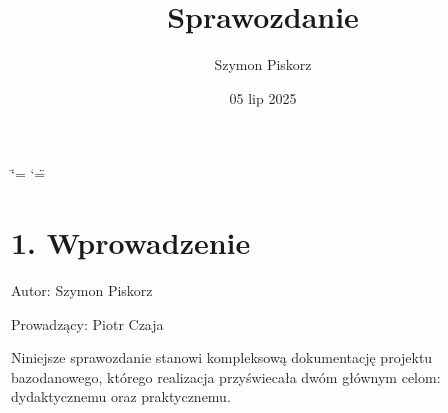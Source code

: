 \documentclass[letterpaper,10pt,polish]{sphinxmanual}
\title{Sprawozdanie}
\date{05 lip 2025}
\author{Szymon Piskorz}
\begin{document}
\ifdefined\shorthandoff
  \ifnum\catcode`\=\string=\active\shorthandoff{=}\fi
  \ifnum\catcode`\"=\active{}\fi
\fi

\pagestyle{empty}
\sphinxmaketitle
\pagestyle{plain}
\sphinxtableofcontents
\pagestyle{normal}
\label{\detokenize{index::doc}}


\sphinxstepscope


\chapter{1. Wprowadzenie}
\label{\detokenize{rozdzial1/rozdzial1:wprowadzenie}}\label{\detokenize{rozdzial1/rozdzial1::doc}}
\sphinxAtStartPar
Autor: Szymon Piskorz

\sphinxAtStartPar
Prowadzący: Piotr Czaja

\sphinxAtStartPar
Niniejsze sprawozdanie stanowi kompleksową dokumentację projektu bazodanowego, którego realizacja przyświecała dwóm głównym celom: dydaktycznemu oraz praktycznemu.
\end{document}
